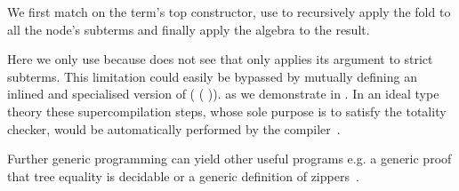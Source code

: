 We first match on the term's top constructor, use 
to recursively apply the fold to all the node's subterms and finally
apply the algebra to the result.

Here we only use \assertTotal{} because \idris{} does not see that
 only applies its argument to strict subterms.
This limitation could easily be bypassed by mutually defining
an inlined and specialised version of
( \IdrisKeyword{\KatlaUnderscore} ( )).
as we demonstrate in .
%
In an ideal type theory these supercompilation steps, whose sole
purpose is to satisfy the totality checker, would be automatically
performed by the compiler~\cite{MANUAL:phd/dublin/Mendel12}.


Further generic programming can yield other useful programs e.g. a
generic proof that tree equality is decidable or a generic definition
of zippers~\cite{DBLP:conf/icfp/LohM11}.
